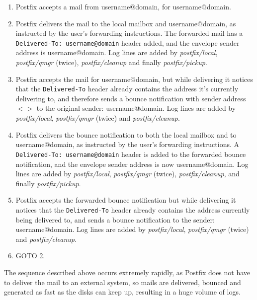 \documentclass[a4paper,12pt,draft]{article}
\begin{document}
\begin{enumerate}

    \item Postfix accepts a mail from username@domain, for username@domain.

    \item Postfix delivers the mail to the local mailbox and
        username@domain, as instructed by the user's forwarding
        instructions. The forwarded mail has a
        \texttt{Delivered-To:~username@domain} header added, and the
        envelope sender address is username@domain.  Log lines are added by
        \textit{postfix/local}, \textit{postfix/qmgr\/} (twice),
        \textit{postfix/cleanup\/} and finally \textit{postfix/pickup}.

    \item Postfix accepts the mail for username@domain, but while
        delivering it notices that the \texttt{Delivered-To} header already
        contains the address it's currently delivering to, and therefore
        sends a bounce notification with sender address \textit{$<>$\/} to
        the original sender: username@domain.  Log lines are added by
        \textit{postfix/local}, \textit{postfix/qmgr\/} (twice) and
        \textit{postfix/cleanup}.

    \item Postfix delivers the bounce notification to both the local
        mailbox and to username@domain, as instructed by the user's
        forwarding instructions.  A \texttt{Delivered-To:~username@domain}
        header is added to the forwarded bounce notification, and the
        envelope sender address is now username@domain.  Log lines are
        added by \textit{postfix/local}, \textit{postfix/qmgr\/} (twice),
        \textit{postfix/cleanup}, and finally \textit{postfix/pickup}.

    \item Postfix accepts the forwarded bounce notification but while
        delivering it notices that the \texttt{Delivered-To} header already
        contains the address currently being delivered to, and sends a
        bounce notification to the sender: username@domain.  Log lines are
        added by \textit{postfix/local}, \textit{postfix/qmgr\/} (twice)
        and \textit{postfix/cleanup}.

    \item GOTO 2.

\end{enumerate}

The sequence described above occurs extremely rapidly, as Postfix does not
have to deliver the mail to an external system, so mails are delivered,
bounced and generated as fast as the disks can keep up, resulting in a huge
volume of logs.
\end{document}
